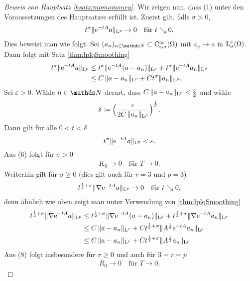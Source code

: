 \begin{proof}[Beweis von Hauptsatz \ref{hsatz:momomoney}]
  Wir zeigen nun, dass (1) unter den Voraussetzungen des Hauptsatzes erfüllt ist.
  Zuerst gilt, falls $\sigma > 0$,
  \begin{align}
    t^\sigma \|\mathrm{e}^{-t A} a \|_{\mathrm{L}^p} \to 0 \quad\text{für } t \searrow 0.
  \end{align}
  Dies beweist man wie folgt:
  Sei $(a_n)_{n \in \N} \subset \CC_{\cc,\sigma}^\infty(\Omega)$ mit $a_n \to a$ in $\mathrm{L}^r_\sigma(\Omega)$.
  Dann folgt mit Satz \ref{thm:lplqSmoothing}
  \begin{align*}
    t^\sigma \|\mathrm{e}^{-t A} a \|_{\mathrm{L}^p} 
    &\leq t^\sigma \|\mathrm{e}^{-tA} (a - a_n) \|_{\mathrm{L}^p} + t^\sigma \|\mathrm{e}^{-tA} a_n \|_{\mathrm{L}^p} \\
    &\leq C\, \|a - a_n\|_{\mathrm{L}^r} + C t^\sigma \|a_n\|_{\mathrm{L}^p}.
  \end{align*}
  Sei $\varepsilon > 0$.
  Wähle $n \in \N$ derart, dass $C\, \|a - a_n\|_{\mathrm{L}^r} < \frac{\varepsilon}{2}$ und wähle
  $$
  \delta \coloneqq \Big( \frac{\varepsilon }{2 C \, \|a_n\|_{\mathrm{L}^p}} \Big)^{\frac{1}{\sigma}}.
  $$
  Dann gilt für alle $0 < t < \delta$
  $$
  t^\sigma \|\mathrm{e}^{-t A} a \|_{\mathrm{L}^p} < \varepsilon.
  $$
  Aus (6) folgt für $\sigma > 0$
  \begin{align}
    K_0 \to 0 \quad\text{für } T \to 0.
  \end{align}
  Weiterhin gilt für $\sigma \geq 0$ (dies gilt auch für $r = 3$ und $p = 3$)
  \begin{align}
    t^{\frac{1}{2} + \sigma} \|\nabla \mathrm{e}^{-t A} a \|_{\mathrm{L}^p} \to 0 \quad\text{für } t \searrow 0,
  \end{align}
  denn ähnlich wie oben zeigt man unter Verwendung von \ref{thm:lplqSmoothing}
  \begin{align*}
    t^{\frac{1}{2} + \sigma} \|\nabla \mathrm{e}^{-t A} a \|_{\mathrm{L}^p}
    &\leq t^{\frac{1}{2} + \sigma} \|\nabla \mathrm{e}^{-tA} (a - a_n)\|_{\mathrm{L}^p} + t^{\frac{1}{2} + \sigma} \|\nabla \mathrm{e}^{-tA} a_n \|_{\mathrm{L}^p} \\
    &\leq C\, \|a - a_n\|_{\mathrm{L}^r} + C t^{\frac{1}{2} + \sigma} \|A^{\frac{1}{2}} \mathrm{e}^{-t A} a_n \|_{\mathrm{L}^p} \\
    &\leq C \, \|a - a_n\|_{\mathrm{L}^r} + C t^{\frac{1}{2} + \sigma} \|A^{\frac{1}{2}} a_n \|_{\mathrm{L}^p}
  \end{align*}
  Aus (8) folgt insbesondere für $\sigma \geq 0$ und auch für $3 = r = p$
  \begin{align}
    R_0 \to 0 \quad\text{für } T \to 0.
  \end{align}


\end{proof}
